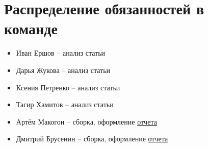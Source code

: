 
\section{Распределение обязанностей в команде}

\begin{itemize}
    \item Иван Ершов -- анализ статьи \cite{pipedream}
    \item Дарья Жукова -- анализ статьи \cite{beginning}
    \item Ксения Петренко -- анализ статьи \cite{shoeybi2019megatron}
    \item Тагир Хамитов -- анализ статьи \cite{DBLP}
    \item Артём Макогон -- сборка, оформление \href{https://github.com/makogon2907/HSE-Practice-Fall-2022}{отчета}
    \item Дмитрий Брусенин -- сборка, оформление \href{https://github.com/makogon2907/HSE-Practice-Fall-2022}{отчета}
\end{itemize}
